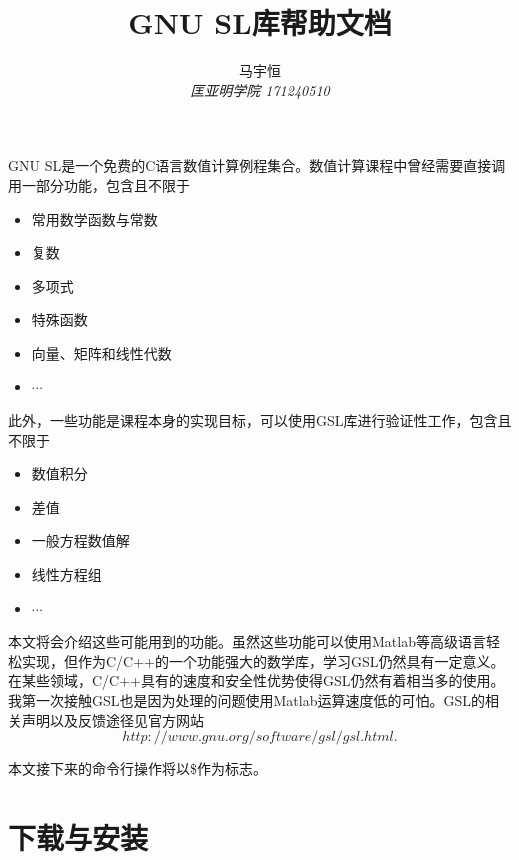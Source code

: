\documentclass[a4paper,11pt,onecolumn,twoside]{article}
\title{\textbf{GNU SL库帮助文档}}
\author{
马宇恒
\\[2pt]
{\small \textit{匡亚明学院 171240510}}}
\date{}
\begin{document}
\maketitle

\tableofcontents
\newpage
\thispagestyle{firststyle}
\setlength{\oddsidemargin}{ 1cm}
\setlength{\evensidemargin}{\oddsidemargin}
\setlength{\textwidth}{15.50cm}
\vspace{-.8cm}


\setcounter{page}{1}

\setlength{\oddsidemargin}{-.5cm}  %
\setlength{\evensidemargin}{\oddsidemargin}
\setlength{\textwidth}{17.00cm}

GNU SL是一个免费的C语言数值计算例程集合。数值计算课程中曾经需要直接调用一部分功能，包含且不限于
\begin{itemize}
\item 常用数学函数与常数
\item 复数
\item 多项式
\item 特殊函数
\item 向量、矩阵和线性代数
\item $\cdots$
\end{itemize}
\par
此外，一些功能是课程本身的实现目标，可以使用GSL库进行验证性工作，包含且不限于
\begin{itemize}
\item 数值积分
\item 差值
\item 一般方程数值解
\item 线性方程组
\item $\cdots$
\end{itemize}
\par
本文将会介绍这些可能用到的功能。虽然这些功能可以使用Matlab等高级语言轻松实现，但作为C/C++的一个功能强大的数学库，学习GSL仍然具有一定意义。在某些领域，C/C++具有的速度和安全性优势使得GSL仍然有着相当多的使用。我第一次接触GSL也是因为处理的问题使用Matlab运算速度低的可怕。GSL的相关声明以及反馈途径见官方网站$$http://www.gnu.org/software/gsl/gsl.html  .$$

本文接下来的命令行操作将以\$作为标志。
\section{下载与安装}
\end{document}
